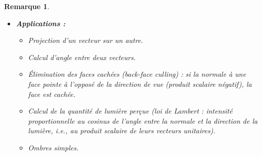 \documentclass{article}
\newtheorem{remark}{Remarque}
\begin{document}
\begin{remark}
\begin{itemize}
    \item \textbf{Applications :}
    \begin{itemize}
        \item Projection d'un vecteur sur un autre.
        \item Calcul d'angle entre deux vecteurs.
        \item Élimination des faces cachées (back-face culling) : si la normale à une face pointe à l'opposé de la direction de vue (produit scalaire négatif), la face est cachée.
        \item Calcul de la quantité de lumière perçue (loi de Lambert : intensité proportionnelle au cosinus de l'angle entre la normale et la direction de la lumière, i.e., au produit scalaire de leurs vecteurs unitaires).
        \item Ombres simples.
    \end{itemize}
\end{itemize}
\end{remark}
\end{document}
